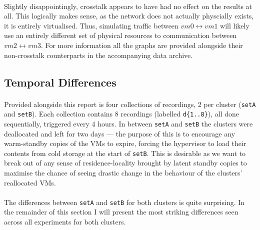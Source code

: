 \documentclass[a4paper,10pt]{article}
\begin{document}
\paragraph{} Slightly disappointingly, crosstalk appears to have had no effect on the results at all. This logically makes sense, as the network does not actually physcially exists, it is entirely virtualised. Thus, simulating traffic between $vm0 \leftrightarrow vm1$ will likely use an entirely different set of physical resources to communication between $vm2 \leftrightarrow vm3$. For more information all the graphs are provided alongside their non-crosstalk counterparts in the accompanying data archive.

\subsection*{Temporal Differences}


\paragraph{} Provided alongside this report is four collections of recordings, 2 per cluster (\texttt{setA} and \texttt{setB}). Each collection contains 8 recordings (labelled \texttt{d\{1..8\}}), all done sequentially, triggered every 4 hours. In between \texttt{setA} and \texttt{setB} the clusters were deallocated and left for two days --- the purpose of this is to encourage any warm-standby copies of the VMs to expire, forcing the hypervisor to load their contents from cold storage at the start of \texttt{setB}. This is desirable as we want to break out of any sense of residence-locality brought by latent standby copies to maximise the chance of seeing drastic change in the behaviour of the clusters' reallocated VMs.

\paragraph{} The differences between \texttt{setA} and \texttt{setB} for both clusters is quite surprising. In the remainder of this section I will present the most striking differences seen across all experiments for both clusters.
\end{document}
